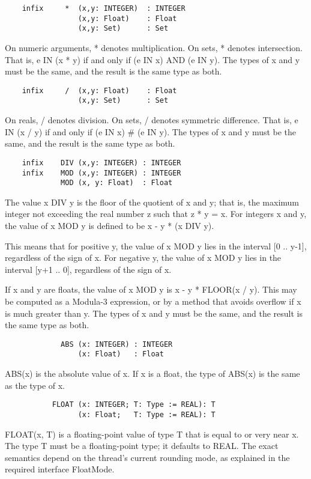 \documentclass[10pt]{article}
\begin{document}
\begin{verbatim}
    infix     *  (x,y: INTEGER)  : INTEGER
                 (x,y: Float)    : Float
                 (x,y: Set)      : Set
\end{verbatim}
On numeric arguments, * denotes multiplication.  On sets, * denotes
intersection.  That is, e IN (x * y) if and only if (e IN x) AND (e IN y).  The
types of x and y must be the same, and the result is the same type as both.

\begin{verbatim}
    infix     /  (x,y: Float)    : Float
                 (x,y: Set)      : Set
\end{verbatim}
On reals, / denotes division.  On sets, / denotes symmetric difference.  That
is, e IN (x / y) if and only if (e IN x) \# (e IN y).  The types of x and y
must be the same, and the result is the same type as both.

\begin{verbatim}
    infix    DIV (x,y: INTEGER) : INTEGER
    infix    MOD (x,y: INTEGER) : INTEGER
             MOD (x, y: Float)  : Float
\end{verbatim}
The value x DIV y is the floor of the quotient of x and y; that is, the
maximum integer not exceeding the real number z such that z * y = x.  For
integers x and y, the value of x MOD y is defined to be x - y * (x DIV y).

This means that for positive y, the value of x MOD y lies in the interval [0
..  y-1], regardless of the sign of x.  For negative y, the value of x MOD y
lies in the interval [y+1 ..  0], regardless of the sign of x.

If x and y are floats, the value of x MOD y is x - y * FLOOR(x / y).  This may
be computed as a Modula-3 expression, or by a method that avoids overflow if x
is much greater than y.  The types of x and y must be the same, and the result
is the same type as both.

\begin{verbatim}
             ABS (x: INTEGER) : INTEGER
                 (x: Float)   : Float
\end{verbatim}
ABS(x) is the absolute value of x.  If x is a float, the type of ABS(x) is the
same as the type of x.

\begin{verbatim}
           FLOAT (x: INTEGER; T: Type := REAL): T
                 (x: Float;   T: Type := REAL): T
\end{verbatim}
FLOAT(x, T) is a floating-point value of type T that is equal to or very near
x.  The type T must be a floating-point type; it defaults to REAL.  The exact
semantics depend on the thread's current rounding mode, as explained in the
required interface FloatMode.
\end{document}
